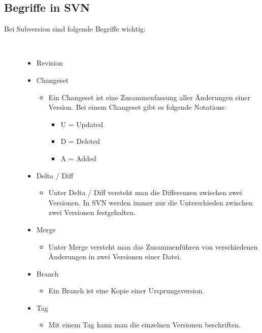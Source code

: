 \subsection{Begriffe in SVN}
\begin{description}
\item[Bei Subversion sind folgende Begriffe wichtig:]~\par
   \begin{itemize}
        \item Revision
        \item Changeset
            \begin{itemize}
        \item Ein Changeset ist eine Zusammenfassung aller \"Anderungen einer Version. Bei einem Changeset gibt es folgende Notations:
        \begin{itemize}
        \item U = Updated
        \item D = Deleted
        \item A = Added
      \end{itemize}
      \end{itemize}
      \item Delta / Diff
              \begin{itemize}
         \item Unter Delta / Diff versteht man die Differenzen zwischen zwei Versionen. In SVN werden immer nur die Unterschieden zwischen zwei Versionen festgehalten.
      \end{itemize}
      \item Merge
              \begin{itemize}
         \item Unter Merge versteht man das Zusammenf\"uhren von verschiedenen \"Anderungen in zwei Versionen einer Datei.
      \end{itemize}
       \item Branch
              \begin{itemize}
         \item Ein Branch ist eine Kopie einer Ursprungsversion.
      \end{itemize}
       \item Tag
              \begin{itemize}
         \item Mit einem Tag kann man die einzelnen Versionen beschriften.
      \end{itemize}
   \end{itemize}
\end{description}
 
